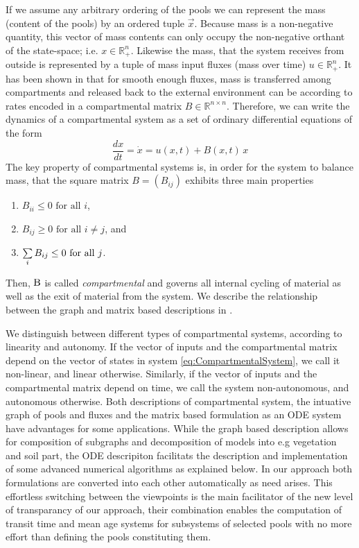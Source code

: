 If we assume any arbitrary ordering of the pools we can represent the mass (content of the pools)
by an ordered tuple $\vec{x}$.
Because mass is a non-negative quantity, this vector of mass contents can
only occupy the non-negative orthant of the state-space; i.e. $x \in
\mathbb{R}^n_+$. 
Likewise the mass, that the system receives from outside is represented
by a tuple of mass input fluxes (mass over time) $u \in \mathbb{R}^n_+$.
It has been shown in \citep{Jacquez1993SIAM}
that for smooth enough fluxes, mass is transferred among compartments and released back to the external
environment can be according to rates encoded in a compartmental matrix $B \in
\mathbb{R}^{n \times n}$. 
Therefore, we can write the dynamics of a
compartmental system as a set of ordinary differential equations of the form
\begin{equation} \label{eq:CompartmentalSystem}
\frac{dx}{dt} = \dot{x} = u(x, t) + B(x, t) \, x
\end{equation}
The key property of compartmental systems is, in order for the system to balance mass, that the square matrix $B=(B_{ij})$ exhibits three main properties
\begin{enumerate}
  \item $B_{ii}\leq0\text{ for all }i$,
  \item $B_{ij}\geq0\text{ for all }i\neq j$, and
  \item $\sum\limits_i B_{ij}\leq 0\text{ for all }j$.
\end{enumerate}
Then, $\mathrm{B}$ is called \emph{compartmental} and governs all internal cycling of material as well as the exit of material from the system.
We describe the relationship between the graph and matrix based descriptions in .

We distinguish between different types of compartmental systems, according to linearity and autonomy. If the vector of inputs and the compartmental matrix depend on the vector of states in system \eqref{eq:CompartmentalSystem}, we call it non-linear, and linear otherwise. Similarly, if the vector of inputs and the compartmental matrix depend on time, we call the system non-autonomous, and autonomous otherwise. 
Both descriptions of compartmental system, the intuative graph of pools and fluxes and the 
matrix based formulation as an ODE system have advantages for some applications. 
While the graph based description allows for composition of subgraphs and decomposition of models into e.g vegetation and soil part, the ODE descripiton facilitats the description and implementation of some advanced numerical algorithms as explained below.
In our approach both formulations are converted into each other automatically as need arises.
This effortless switching between the viewpoints is the main facilitator of the new level of transparancy of our approach, their combination enables the computation of transit time and mean age systems for subsystems of selected pools with no more effort than defining the pools constituting them.

